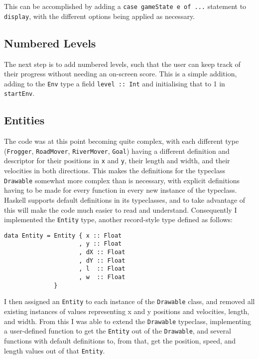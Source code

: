 \documentclass[12pt, a4paper]{report}
\begin{document}
This can be accomplished by adding a \verb|case gameState e of ...| statement to \verb|display|, with the different options being applied as necessary.

\subsection{Numbered Levels}

The next step is to add numbered levels, such that the user can keep track of their progress without needing an on-screen score.
This is a simple addition, adding to the \verb|Env| type a field \verb|level :: Int| and initialising that to 1 in \verb|startEnv|.

\subsection{Entities}

The code was at this point becoming quite complex, with each different type (\verb|Frogger|, \verb|RoadMover|, \verb|RiverMover|, \verb|Goal|) having a different definition and descriptor for their positions in \verb|x| and \verb|y|, their length and width, and their velocities in both directions.
This makes the definitions for the typeclass \verb|Drawable| somewhat more complex than is necessary, with explicit definitions having to be made for every function in every new instance of the typeclass.
Haskell supports default definitions in its typeclasses, and to take advantage of this will make the code much easier to read and understand.
Consequently I implemented the \verb|Entity| type, another record-style type defined as follows:

\begin{lstlisting}
data Entity = Entity { x :: Float
                     , y :: Float
                     , dX :: Float
                     , dY :: Float
                     , l  :: Float
                     , w  :: Float
              }

\end{lstlisting}

I then assigned an \verb|Entity| to each instance of the \verb|Drawable| class, and removed all existing instances of values representing x and y positions and velocities, length, and width.
From this I was able to extend the \verb|Drawable| typeclass, implementing a user-defined function to get the \verb|Entity| out of the \verb|Drawable|, and several functions with default definitions to, from that, get the position, speed, and length values out of that \verb|Entity|.
\end{document}
